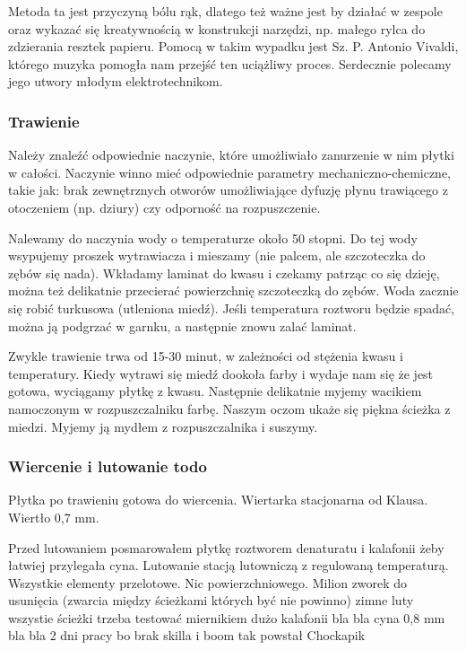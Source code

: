 Metoda ta jest przyczyną bólu rąk, dlatego też ważne jest by działać w zespole oraz wykazać się kreatywnością w konstrukcji narzędzi, np. małego rylca do zdzierania resztek papieru. Pomocą w takim wypadku jest Sz. P. Antonio Vivaldi, którego muzyka pomogła nam przejść ten uciążliwy proces. Serdecznie polecamy jego utwory młodym elektrotechnikom.

\subsubsection{Trawienie}

Należy znaleźć odpowiednie naczynie, które umożliwiało zanurzenie w nim płytki w całości. Naczynie winno mieć odpowiednie parametry mechaniczno-chemiczne, takie jak: brak zewnętrznych otworów umożliwiające dyfuzję płynu trawiącego z otoczeniem (np. dziury) czy odporność na rozpuszczenie.

Nalewamy do naczynia wody o temperaturze około 50 stopni. Do tej wody wsypujemy proszek wytrawiacza i mieszamy (nie palcem, ale szczoteczka do zębów się nada). Wkładamy laminat do kwasu i czekamy patrząc co się dzieję, można też delikatnie przecierać powierzchnię szczoteczką do zębów. Woda zacznie się robić turkusowa (utleniona miedź). Jeśli temperatura roztworu będzie spadać, można ją podgrzać w garnku, a następnie znowu zalać laminat. 

Zwykle trawienie trwa od 15-30 minut, w zależności od stężenia kwasu i temperatury. Kiedy wytrawi się miedź dookoła farby i wydaje nam się że jest gotowa, wyciągamy płytkę z kwasu. Następnie delikatnie myjemy wacikiem namoczonym w rozpuszczalniku farbę. Naszym oczom ukaże się piękna ścieżka z miedzi. Myjemy ją mydłem z rozpuszczalnika i suszymy.

\subsubsection{Wiercenie i lutowanie todo}

Płytka po trawieniu gotowa do wiercenia. 
Wiertarka stacjonarna od Klausa. Wiertło 0,7 mm. 

Przed lutowaniem posmarowałem płytkę roztworem denaturatu i kalafonii żeby łatwiej przylegała cyna. 
Lutowanie stacją lutowniczą z regulowaną temperaturą. 
Wszystkie elementy przelotowe. Nic powierzchniowego. 
Milion zworek do usunięcia (zwarcia między ścieżkami których być nie powinno)
zimne luty
wszystie ścieżki trzeba testować miernikiem 
dużo kalafonii bla bla
cyna 0,8 mm
bla bla 2 dni pracy bo brak skilla 
i boom tak powstał Chockapik 


